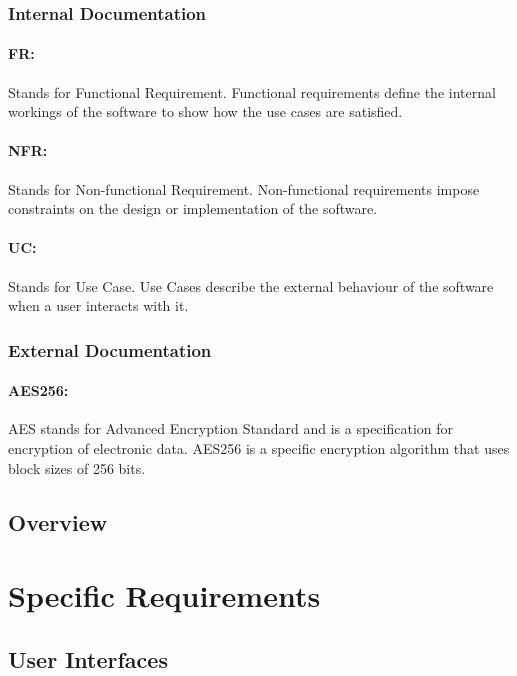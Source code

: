 \documentclass[11pt]{article}
\begin{document}
\subsubsection{Internal Documentation}
\paragraph{FR:} Stands for Functional Requirement. Functional requirements define the internal workings of the software to show how the use cases are satisfied.
\paragraph{NFR:} Stands for Non-functional Requirement. Non-functional requirements impose constraints on the design or implementation of the software.
\paragraph{UC:} Stands for Use Case. Use Cases describe the external behaviour of the software when a user interacts with it.
\subsubsection{External Documentation}
\paragraph{AES256:} AES stands for Advanced Encryption Standard and is a specification for encryption of electronic data. AES256 is a specific encryption algorithm that uses block sizes of 256 bits.
\subsection{Overview}

\section{Specific Requirements}
\subsection{User Interfaces}
\end{document}

